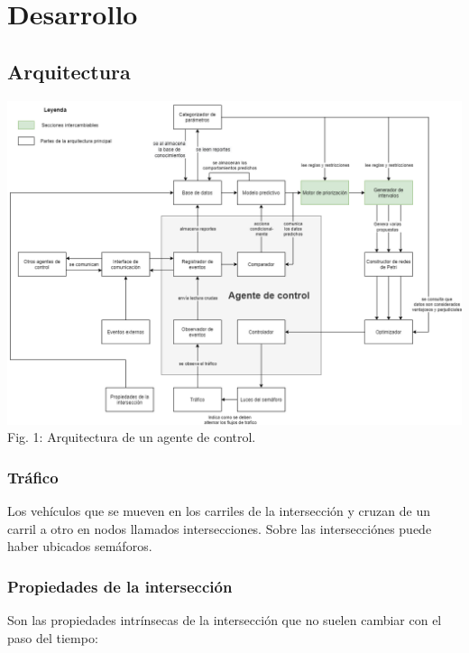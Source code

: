 
\chapter{Desarrollo} %
\graphicspath{{./../imagenes/}}
\linespread{1.3}
\hypertarget{arquitectura}{%
\section{Arquitectura}\label{arquitectura}}

\includegraphics[width=\textwidth]{arquitectura.png} Fig. 1:
Arquitectura de un agente de control.

\hypertarget{truxe1fico}{%
\subsection{Tráfico}\label{truxe1fico}}

Los vehículos que se mueven en los carriles de la intersección y cruzan
de un carril a otro en nodos llamados intersecciones. Sobre las
intersecciónes puede haber ubicados semáforos.

\hypertarget{propiedades-de-la-intersecciuxf3n}{%
\subsection{Propiedades de la
intersección}\label{propiedades-de-la-intersecciuxf3n}}

Son las propiedades intrínsecas de la intersección que no suelen cambiar
con el paso del tiempo:

